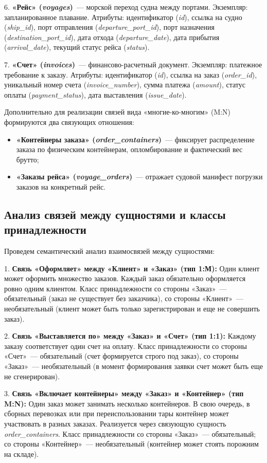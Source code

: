 \documentclass[a4paper,14pt]{article}
\begin{document}
6. \textbf{«Рейс» (\textit{voyages})}~--- морской переход судна между портами. Экземпляр: запланированное плавание. Атрибуты: идентификатор (\textit{id}), ссылка на судно (\textit{ship\_id}), порт отправления (\textit{departure\_port\_id}), порт назначения (\textit{destination\_port\_id}), дата отхода (\textit{departure\_date}), дата прибытия (\textit{arrival\_date}), текущий статус рейса (\textit{status}).

7. \textbf{«Счет» (\textit{invoices})}~--- финансово-расчетный документ. Экземпляр: платежное требование к заказу. Атрибуты: идентификатор (\textit{id}), ссылка на заказ (\textit{order\_id}), уникальный номер счета (\textit{invoice\_number}), сумма платежа (\textit{amount}), статус оплаты (\textit{payment\_status}), дата выставления (\textit{issue\_date}).

Дополнительно для реализации связей вида «многие-ко-многим» (M:N) формируются два связующих отношения:
\begin{itemize}
    \item \textbf{«Контейнеры заказа» (\textit{order\_containers})}~--- фиксирует распределение заказа по физическим контейнерам, опломбирование и фактический вес брутто;
    \item \textbf{«Заказы рейса» (\textit{voyage\_orders})}~--- отражает судовой манифест погрузки заказов на конкретный рейс.
\end{itemize}

\subsection{Анализ связей между сущностями и классы принадлежности}
Проведем семантический анализ взаимосвязей между сущностями:

1. \textbf{Связь «Оформляет» между «Клиент» и «Заказ» (тип 1:М):}
Один клиент может оформить множество заказов. Каждый заказ обязательно оформляется ровно одним клиентом. Класс принадлежности со стороны «Заказ»~--- обязательный (заказ не существует без заказчика), со стороны «Клиент»~--- необязательный (клиент может быть только зарегистрирован и еще не совершить заказ).

2. \textbf{Связь «Выставляется по» между «Заказ» и «Счет» (тип 1:1):}
Каждому заказу соответствует один счет на оплату. Класс принадлежности со стороны «Счет»~--- обязательный (счет формируется строго под заказ), со стороны «Заказ»~--- необязательный (в момент формирования заявки счет может быть еще не сгенерирован).

3. \textbf{Связь «Включает контейнеры» между «Заказ» и «Контейнер» (тип M:N):}
Один заказ может занимать несколько контейнеров. В свою очередь, в сборных перевозках или при переиспользовании тары контейнер может участвовать в разных заказах. Реализуется через связующую сущность \textit{order\_containers}. Класс принадлежности со стороны «Заказ»~--- обязательный; со стороны «Контейнер»~--- необязательный (контейнер может стоять порожним на складе).
\end{document}
